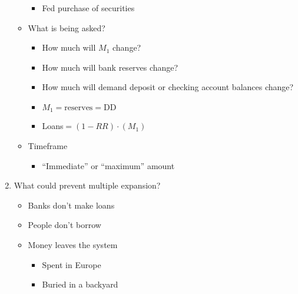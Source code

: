 \documentclass[12pt]{article}
\begin{document}
\begin{enumerate}
\begin{itemize}
\begin{itemize}
          \item Fed purchase of securities
            
        \end{itemize}

      \item What is being asked?

        \begin{itemize}

          \item How much will $M_1$ change?

          \item How much will bank reserves change?

          \item How much will demand deposit or checking account balances change?

          \item $M_1 = \text{reserves} = \text{DD}$

          \item Loans$ = (1-RR)\cdot(M_1)$

        \end{itemize}

      \item Timeframe

        \begin{itemize}

          \item “Immediate” or “maximum” amount

        \end{itemize}
        
    \end{itemize}

  \item What could prevent multiple expansion?

    \begin{itemize}

      \item Banks don't make loans

      \item People don't borrow

      \item Money leaves the system

        \begin{itemize}

          \item Spent in Europe

          \item Buried in a backyard

        \end{itemize}

    \end{itemize}

\end{enumerate}
\end{document}
